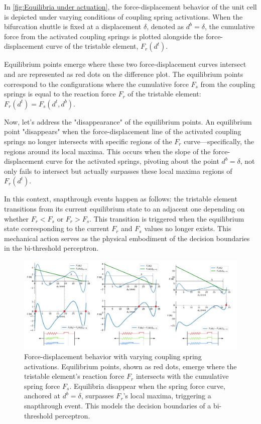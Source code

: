     In \autoref*{fig:Equilibria under actuation}, the force-displacement behavior of the unit cell is depicted under varying conditions of coupling spring activations. When the bifurcation shuttle is fixed at a displacement \( \delta \), denoted as \( d^b = \delta \), the cumulative force from the activated coupling springs is plotted alongside the force-displacement curve of the tristable element, \( F_r(d^t) \).

    Equilibrium points emerge where these two force-displacement curves intersect and are represented as red dots on the difference plot. The equilibrium points correspond to the configurations where the cumulative force \( F_s \) from the coupling springs is equal to the reaction force \( F_r \) of the tristable element: \( F_r(d^t) = F_s(d^t, d^b) \).
    
    Now, let's address the "disappearance" of the equilibrium points. An equilibrium point "disappears" when the force-displacement line of the activated coupling springs no longer intersects with specific regions of the \( F_r \) curve—specifically, the regions around its local maxima. This occurs when the slope of the force-displacement curve for the activated springs, pivoting about the point \( d^b = \delta \), not only fails to intersect but actually surpasses these local maxima regions of \( F_r(d^t) \).
    
    In this context, snapthrough events happen as follows: the tristable element transitions from its current equilibrium state to an adjacent one depending on whether \( F_r < F_s \) or \( F_r > F_s \). This transition is triggered when the equilibrium state corresponding to the current \( F_r \) and \( F_s \) values no longer exists. This mechanical action serves as the physical embodiment of the decision boundaries in the bi-threshold perceptron.


\begin{figure}[H]
    \centering
    \includegraphics[width=\textwidth]{images/SVGs/Equilibria2.pdf}
    \caption{Force-displacement behavior with varying coupling spring activations. Equilibrium points, shown as red dots, emerge where the tristable element's reaction force \( F_r \) intersects with the cumulative spring force \( F_s \). Equilibria disappear when the spring force curve, anchored at \( d^b = \delta \), surpasses \( F_r \)'s local maxima, triggering a snapthrough event. This models the decision boundaries of a bi-threshold perceptron.}
    \label{fig:Equilibria under actuation}
\end{figure}

